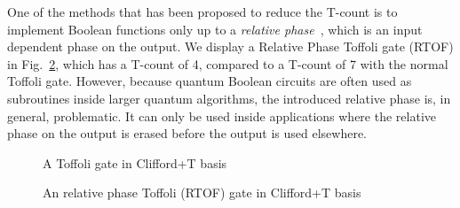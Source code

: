 \documentclass[a4paper]{article}
\begin{document}
One of the methods that has been proposed to reduce the T-count is to implement Boolean functions only
up to a {\it relative phase}~\cite{bib-barenco-elementary}, which is an input dependent phase on the
output. We display a Relative Phase Toffoli gate (RTOF) in Fig.~\ref{fig-rtof}, which has a T-count of 4,
compared to a T-count of 7 with the normal Toffoli gate. However, because quantum Boolean circuits are often
used as subroutines inside larger quantum algorithms, the introduced relative phase is, in general, problematic.
It can only be used inside applications where the relative phase on the output is erased before the
output is used elsewhere. 

\begin{figure}[t]
  \centering
  \scalebox{0.7}{
    
  }
    \caption{A Toffoli gate in Clifford+T basis}
    \label{fig-toffoli}
    \vspace{-5mm}
\end{figure}
\begin{figure}[t]
  \centering
  \scalebox{0.7}{
    
  }
  
    \caption{An relative phase Toffoli (RTOF) gate in Clifford+T basis}
    \label{fig-rtof}
    \vspace{-5mm}
\end{figure}
\end{document}

